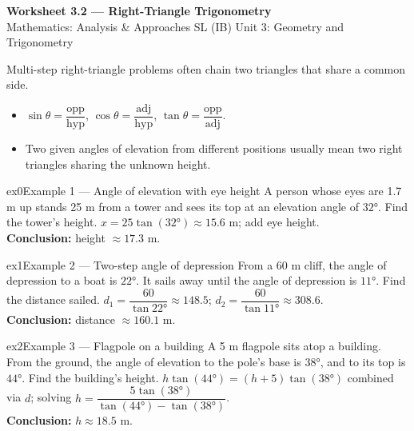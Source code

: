 \documentclass[11pt]{article}
\begin{document}
\begin{center}
{\LARGE\bfseries\color{titleblue}Worksheet 3.2 --- Right-Triangle Trigonometry}\\[2pt]
{\small Mathematics: Analysis \& Approaches SL (IB) \textperiodcentered{} Unit 3: Geometry and Trigonometry}
\end{center}

\begin{ideabox}
Multi-step right-triangle problems often chain two triangles that share a common side.
\begin{itemize}[leftmargin=*,itemsep=2pt]
  \item $\sin\theta=\dfrac{\text{opp}}{\text{hyp}}$, $\cos\theta=\dfrac{\text{adj}}{\text{hyp}}$, $\tan\theta=\dfrac{\text{opp}}{\text{adj}}$.
  \item Two given angles of elevation from different positions usually mean two right triangles sharing the unknown height.
\end{itemize}
\end{ideabox}


\begin{example}{ex0}{Example 1 --- Angle of elevation with eye height}
A person whose eyes are 1.7 m up stands 25 m from a tower and sees its top at an elevation angle of $32°$. Find the tower's height.\soln
$x=25\tan(32°)\approx15.6$ m; add eye height.\\[3pt]\textbf{Conclusion:} height $\approx17.3$ m.
\end{example}

\begin{example}{ex1}{Example 2 --- Two-step angle of depression}
From a 60 m cliff, the angle of depression to a boat is $22°$. It sails away until the angle of depression is $11°$. Find the distance sailed.\soln
$d_1=\dfrac{60}{\tan22°}\approx148.5$; $d_2=\dfrac{60}{\tan11°}\approx308.6$.\\[3pt]\textbf{Conclusion:} distance $\approx160.1$ m.
\end{example}

\begin{example}{ex2}{Example 3 --- Flagpole on a building}
A 5 m flagpole sits atop a building. From the ground, the angle of elevation to the pole's base is $38°$, and to its top is $44°$. Find the building's height.\soln
$h\tan(44°)=(h+5)\tan(38°)$ combined via $d$; solving $h=\dfrac{5\tan(38°)}{\tan(44°)-\tan(38°)}$.\\[3pt]\textbf{Conclusion:} $h\approx18.5$ m.
\end{example}
\end{document}
